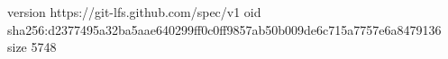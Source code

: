 version https://git-lfs.github.com/spec/v1
oid sha256:d2377495a32ba5aae640299ff0c0ff9857ab50b009de6c715a7757e6a8479136
size 5748

